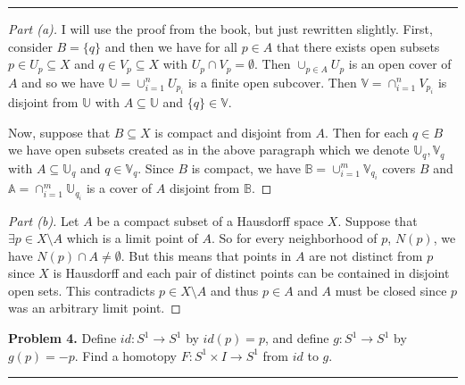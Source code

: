 \documentclass[leqno]{article}
\theoremstyle{nonumberplain}
\newtheorem{proof}{Proof}
\begin{document}
\noindent\rule[0.5ex]{\linewidth}{1pt}

\begin{proof}[Part (a)]
I will use the proof from the book, but just rewritten slightly.  First, consider $B=\{q\}$ and then we have for all $p\in A$ that there exists open subsets $p\in U_p \subseteq X$ and $q\in V_p \subseteq X$ with $U_p\cap V_p = \emptyset$.  Then $\cup_{p\in A}U_p$ is an open cover of $A$ and so we have $\mathbb{U}=\cup_{i=1}^n U_{p_i}$ is a finite open subcover. Then $\mathbb{V}=\cap_{i=1}^n V_{p_i}$ is disjoint from $\mathbb{U}$ with $A\subseteq \mathbb{U}$ and $\{q\}\in \mathbb{V}$.

Now, suppose that $B\subseteq X$ is compact and disjoint from $A$.  Then for each $q\in B$ we have open subsets created as in the above paragraph which we denote $\mathbb{U}_q,\mathbb{V}_q$ with $A\subseteq \mathbb{U}_q$ and $q\in \mathbb{V}_q$. Since $B$ is compact, we have $\mathbb{B}=\cup_{i=1}^m \mathbb{V}_{q_i}$ covers $B$ and $\mathbb{A}=\cap_{i=1}^m \mathbb{U}_{q_i}$ is a cover of $A$ disjoint from $\mathbb{B}$.  
\end{proof}

\begin{proof}[Part (b)]
Let $A$ be a compact subset of a Hausdorff space $X$.  Suppose that $\exists p \in X\setminus A$ which is a limit point of $A$.  So for every neighborhood of $p$, $N(p)$, we have $N(p)\cap A \neq \emptyset$.  But this means that points in $A$ are not distinct from $p$ since $X$ is Hausdorff and each pair of distinct points can be contained in disjoint open sets.  This contradicts $p\in X\setminus A$ and thus $p\in A$ and $A$ must be closed since $p$ was an arbitrary limit point.

\end{proof}

\pagebreak





\noindent\textbf{Problem 4.}  Define $id\colon S^1 \to S^1$ by $id(p)=p$, and define $g\colon S^1 \to S^1$ by $g(p)=-p$. Find a homotopy $F\colon S^1 \times I \to S^1$ from $id$ to $g$.

\noindent\rule[0.5ex]{\linewidth}{1pt}
\end{document}
